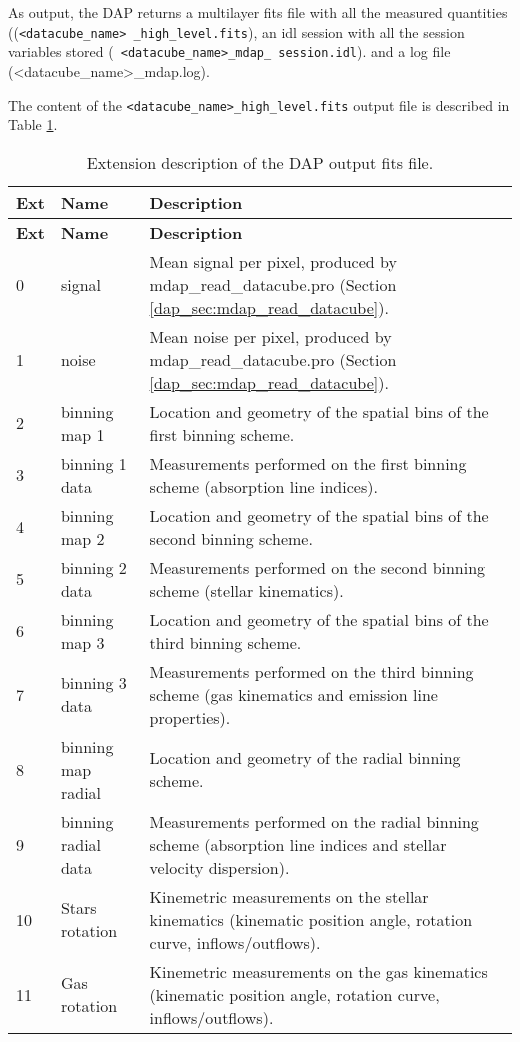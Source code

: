 As output, the DAP returns a multilayer fits file with all the
measured quantities (({\tt <datacube\_name> \_high\_level.fits}), an
idl session with all the session variables stored ({\tt
  <datacube\_name>\_mdap\_ session.idl}).  and a log file
(<datacube\_name>\_mdap.log).

The content of the {\tt <datacube\_name>\_high\_level.fits} output
file is described in Table \ref{dap_tab:output}.


\begin{center}
\begin{longtable}{p{0.5cm}|p{3.5cm}| p{10.1cm}}
\caption{Extension description of the DAP output fits file.} \label{dap_tab:output} \\
\hline
{\bf Ext} &  {\bf Name} &{\bf Description} \\
\hline
\endfirsthead
\hline
{\bf Ext} &  {\bf Name} &{\bf Description} \\
\hline
\endhead
\hline
\endlastfoot
\hline
0 & signal              & Mean signal per pixel, produced by mdap\_read\_datacube.pro (Section \ref{dap_sec:mdap_read_datacube}). \\
1 & noise               & Mean noise per pixel, produced by mdap\_read\_datacube.pro (Section \ref{dap_sec:mdap_read_datacube}).\\
2 & binning map 1       & Location and geometry of the spatial bins of the first binning scheme.\\ 
3 & binning 1 data      & Measurements performed on the first binning scheme (absorption line indices).\\ 
4 & binning map 2       & Location and geometry of the spatial bins of the second binning scheme.\\ 
5 & binning 2 data      & Measurements performed on the second binning scheme (stellar kinematics). \\ 
6 & binning map 3       & Location and geometry of the spatial bins of the third binning scheme.\\ 
7 & binning 3 data      & Measurements performed on the third binning scheme (gas kinematics and emission line properties).\\ 
8 & binning map radial  & Location and geometry of the radial binning scheme.\\ 
9 & binning radial data & Measurements performed on the radial binning scheme (absorption line indices and stellar velocity dispersion).  \\ 
10 & Stars rotation & Kinemetric measurements on the stellar kinematics (kinematic position angle, rotation curve, inflows/outflows).  \\ 
11 & Gas rotation   & Kinemetric measurements on the gas kinematics (kinematic position angle, rotation curve, inflows/outflows).  \\ 
\hline
\end{longtable}
\end{center}

